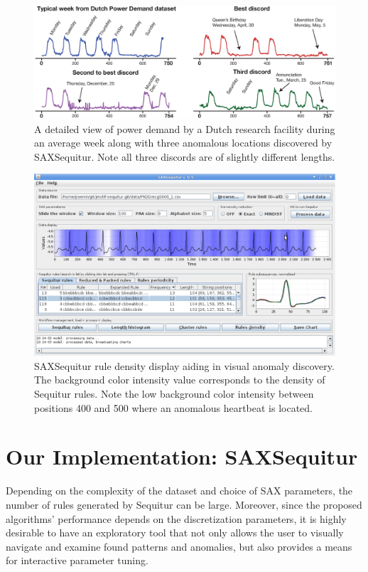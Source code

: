 \documentclass{llncs}
\begin{document}
\begin{figure}[!t]
 \vspace{-0.3cm}
 \centering
 \includegraphics[width=120mm]{DutchPD_new1.eps}
 \caption{A detailed view of power demand by a Dutch research facility during an average week along with three anomalous locations discovered by SAXSequitur. Note all three discords are of slightly different lengths.}
 \label{fig:dutch_PD2}
 \vspace{-0.3cm}
\end{figure}

\begin{figure}[t]
   \vspace{-0.2cm}
   \hspace{-0.1cm}  
   \centering
   \includegraphics[width=123mm]{ECG2_screen_density.eps}
   \caption{
   SAXSequitur rule density display aiding in visual anomaly discovery. The background color intensity value corresponds to the density of Sequitur rules. Note the low background color intensity between positions 400 and 500 where an anomalous heartbeat is located.}
   \label{fig:densityECG}
   \vspace{-0.3cm}
\end{figure}

\section{Our Implementation: SAXSequitur}\label{section_implementation}
Depending on the complexity of the dataset and choice of SAX parameters, the number of rules generated by Sequitur can be large. Moreover, since the proposed algorithms' performance depends on the discretization parameters, it is highly desirable to have an exploratory tool that not only allows the user to visually navigate and examine found patterns and anomalies, but also provides a means for interactive parameter tuning.
\end{document}
